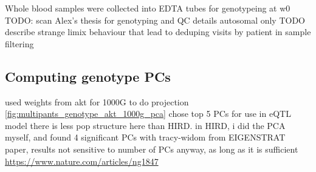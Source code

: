 \begin{outline}
\1 Whole blood samples were collected into EDTA tubes for genotypeing at w0
\1 TODO: scan Alex's thesis for genotyping and QC details
    \2 autosomal only
    \2 TODO describe strange limix behaviour that lead to deduping visits by patient in sample filtering


\subsection{Computing genotype PCs}

\1 used weights from akt for 1000G to do projection \autoref{fig:multipants_genotype_akt_1000g_pca}
\1 chose top 5 PCs for use in eQTL model
    \2 there is less pop structure here than HIRD. in HIRD, i did the PCA myself, and found 4 significant PCs with tracy-widom
    \2 from EIGENSTRAT paper, results not sensitive to number of PCs anyway, as long as it is sufficient \url{https://www.nature.com/articles/ng1847}


\end{outline}

